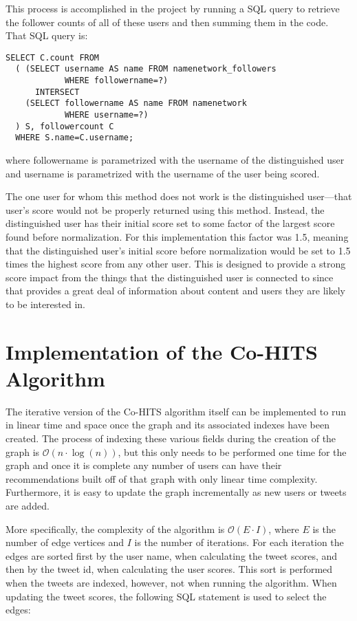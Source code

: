 This process is accomplished in the project by running a SQL query to retrieve the follower counts of all of these users and then summing them in the code. That SQL query is:

\begin{verbatim}
SELECT C.count FROM
  ( (SELECT username AS name FROM namenetwork_followers
            WHERE followername=?)
      INTERSECT
    (SELECT followername AS name FROM namenetwork
            WHERE username=?)
  ) S, followercount C
  WHERE S.name=C.username;
\end{verbatim}

\noindent
where followername is parametrized with the username of the distinguished user and username is parametrized with the username of the user being scored.

The one user for whom this method does not work is the distinguished user---that user's score would not be properly returned using this method. Instead, the distinguished user has their initial score set to some factor of the largest score found before normalization. For this implementation this factor was 1.5, meaning that the distinguished user's initial score before normalization would be set to 1.5 times the highest score from any other user. This is designed to provide a strong score impact from the things that the distinguished user is connected to since that provides a great deal of information about content and users they are likely to be interested in.


\section{Implementation of the Co-HITS Algorithm}


The iterative version of the Co-HITS algorithm itself can be implemented to run in linear time and space once the graph and its associated indexes have been created. The process of indexing these various fields during the creation of the graph is $\mathcal{O}(n \cdot \log(n))$, but this only needs to be performed one time for the graph and once it is complete any number of users can have their recommendations built off of that graph with only linear time complexity. Furthermore, it is easy to update the graph incrementally as new users or tweets are added.

More specifically, the complexity of the algorithm is $\mathcal{O}(E \cdot I)$, where $E$ is the number of edge vertices and $I$ is the number of iterations. For each iteration the edges are sorted first by the user name, when calculating the tweet scores, and then by the tweet id, when calculating the user scores. This sort is performed when the tweets are indexed, however, not when running the algorithm. When updating the tweet scores, the following SQL statement is used to select the edges:

